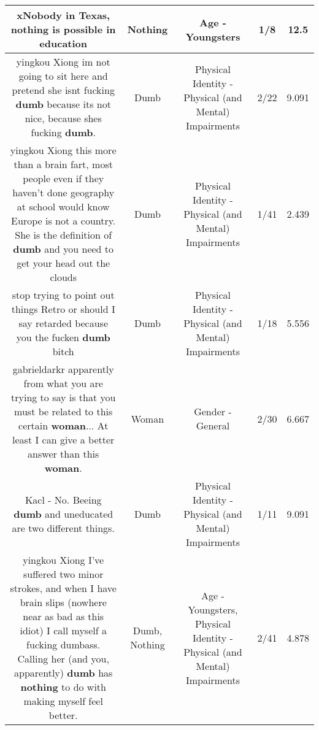 \documentclass[11pt]{article}
\newlength\mylength
\begin{document}
\begin{center}
\begin{longtable}{|C{.65\mylength}|C{.30\mylength}|C{.12\mylength}|C{.12\mylength}|C{.12\mylength}|}
  \small   xNobody in Texas, \textbf{nothing} is possible in education\normalsize   & Nothing & Age - Youngsters & 1/8 & 12.5 \\  \hline
  \small yingkou Xiong im not going to sit here and pretend she isnt fucking \textbf{dumb} because its not nice, because shes fucking \textbf{dumb}.\normalsize   & Dumb & Physical Identity - Physical (and Mental) Impairments & 2/22 & 9.091 \\  \hline
  \small yingkou Xiong this more than a brain fart, most people even if they haven't done geography at school would know Europe is not a country. She is the definition of \textbf{dumb} and you need to get your head out the clouds\normalsize   & Dumb & Physical Identity - Physical (and Mental) Impairments & 1/41 & 2.439 \\  \hline
  \small stop trying to point out things Retro or should I say retarded because you the fucken \textbf{dumb} bitch\normalsize   & Dumb & Physical Identity - Physical (and Mental) Impairments & 1/18 & 5.556 \\  \hline
  \small gabrieldarkr apparently from what you are trying to say is that you must be related to this certain \textbf{woman}... At least I can give a better answer than this \textbf{woman}.\normalsize   & Woman & Gender - General & 2/30 & 6.667 \\  \hline
  \small Kacl - No. Beeing \textbf{dumb} and uneducated are two different things.\normalsize   & Dumb & Physical Identity - Physical (and Mental) Impairments & 1/11 & 9.091 \\  \hline
  \small yingkou Xiong I've suffered two minor strokes, and when I have brain slips (nowhere near as bad as this idiot) I call myself a fucking dumbass. Calling her (and you, apparently) \textbf{dumb} has \textbf{nothing} to do with making myself feel better.\normalsize   & Dumb, Nothing & Age - Youngsters, Physical Identity - Physical (and Mental) Impairments & 2/41 & 4.878 \\  \hline

\end{longtable}
\end{center}
\end{document}
